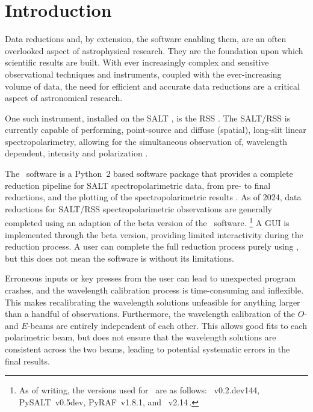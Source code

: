 \chapter{Introduction} \label{ch:01}

Data reductions and, by extension, the software enabling them, are an often overlooked aspect of astrophysical research.
They are the foundation upon which scientific results are built.
With ever increasingly complex and sensitive observational techniques and instruments, coupled with the ever-increasing volume of data, the need for efficient and accurate data reductions are a critical aspect of astronomical research.

One such instrument, installed on the \gls{SALT} \citep{SALT_design}, is the \gls{RSS} \citep{SALT_optical_design}.
The \gls{SALT}/\gls{RSS} is currently capable of performing, point-source and diffuse (spatial), long-slit linear spectropolarimetry, allowing for the simultaneous observation of, wavelength dependent, intensity and polarization \citep{SALT_hires}.

The \polsalt\ software is a Python~$2$ based software package that provides a complete reduction pipeline for \gls{SALT} spectro\-polarimetric data, from pre- to final reductions, and the plotting of the spectro\-polarimetric results \citep{polsalt}.
As of 2024, data reductions for \gls{SALT}/\gls{RSS} spectropolarimetric observations are generally completed using an adaption of the beta version of the \polsalt\ software.%
\footnote{As of writing, the versions used for \polsalt\ are as follows: \polsalt~v0.2.dev144, PySALT~v0.5dev, PyRAF~v1.8.1, and ~v2.14\,.}
A \gls{GUI} is implemented through the beta version, providing limited interactivity during the reduction process.
A user can complete the full reduction process purely using \polsalt, but this does not mean the software is without its limitations.

Erroneous inputs or key presses from the user can lead to unexpected program crashes, and the wavelength calibration process is time-consuming and inflexible.
This makes recalibrating the wavelength solutions unfeasible for anything larger than a handful of observations.
Furthermore, the wavelength calibration of the $O$- and $E$-beams are entirely independent of each other.
This allows good fits to each polarimetric beam, but does not ensure that the wavelength solutions are consistent across the two beams, leading to potential systematic errors in the final results.

